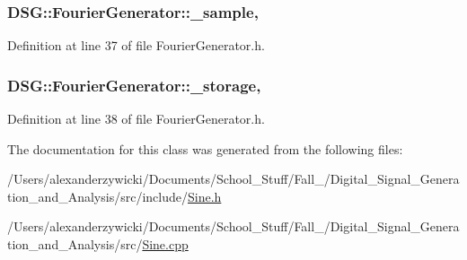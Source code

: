 \hypertarget{classDSG_1_1FourierGenerator_ab96bed1cd59c42e82a689036e5c62bef}{
\subsubsection[{\+\_\+sample}]{ D\+S\+G\+::\+Fourier\+Generator\+::\+\_\+sample\hspace{0.3cm}{\ttfamily [protected]}, {\ttfamily [inherited]}}}\label{classDSG_1_1FourierGenerator_ab96bed1cd59c42e82a689036e5c62bef}


Definition at line 37 of file Fourier\+Generator.\+h.

\hypertarget{classDSG_1_1FourierGenerator_a6b7f2439b26914cc9df6b6975a2cedac}{
\subsubsection[{\+\_\+storage}]{ D\+S\+G\+::\+Fourier\+Generator\+::\+\_\+storage\hspace{0.3cm}{\ttfamily [protected]}, {\ttfamily [inherited]}}}\label{classDSG_1_1FourierGenerator_a6b7f2439b26914cc9df6b6975a2cedac}


Definition at line 38 of file Fourier\+Generator.\+h.



The documentation for this class was generated from the following files\+:\begin{DoxyCompactItemize}
\item 
/\+Users/alexanderzywicki/\+Documents/\+School\+\_\+\+Stuff/\+Fall\+\_/\+Digital\+\_\+\+Signal\+\_\+\+Generation\+\_\+and\+\_\+\+Analysis/src/include/\hyperlink{Sine_8h}{Sine.\+h}\item 
/\+Users/alexanderzywicki/\+Documents/\+School\+\_\+\+Stuff/\+Fall\+\_/\+Digital\+\_\+\+Signal\+\_\+\+Generation\+\_\+and\+\_\+\+Analysis/src/\hyperlink{Sine_8cpp}{Sine.\+cpp}\end{DoxyCompactItemize}
